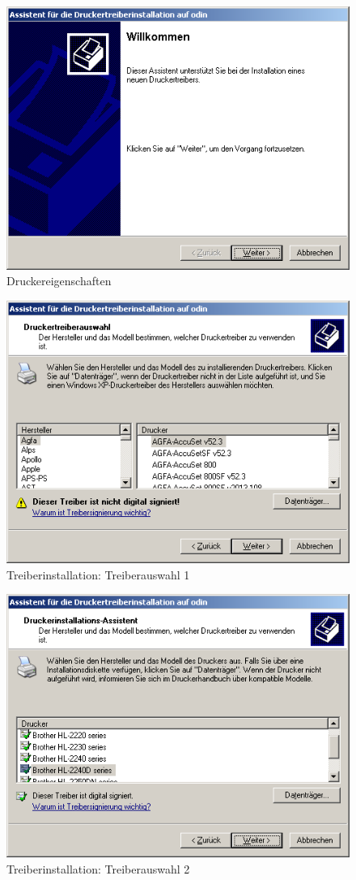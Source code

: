 \begin{figure}[hbt!]
\centering
\includegraphics[width=\columnwidth]{image010}
\caption{Druckereigenschaften}
\label{fig:sambalpd:setup-start}
\end{figure}

\begin{figure}[hbt!]
\centering
\includegraphics[width=0.7\columnwidth]{image011}
\caption{Treiberinstallation: Treiberauswahl 1}
\label{fig:sambalpd:setup-choose-driver:1}
\end{figure}

\begin{figure}[hbt!]
\centering
\includegraphics[width=0.7\columnwidth]{image012}
\caption{Treiberinstallation: Treiberauswahl 2}
\label{fig:sambalpd:setup-choose-driver:2}
\end{figure}

